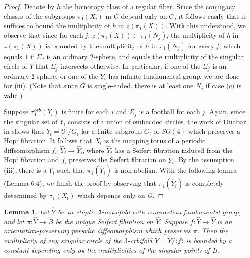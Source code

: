 \documentclass[11pt]{amsart}
\theoremstyle{plain}
\numberwithin{theorem}{section}
\newtheorem{lemma}[theorem]{Lemma}
\theoremstyle{definition}
\begin{document}
\begin{proof}
Denote by $h$ the homotopy class of a regular fiber. Since the conjugacy 
classes of the subgroups $\pi_1(X_i)$ in $G$ depend only on $G$, it follows easily that 
it suffices to bound the multiplicity of $h$ in $z(\pi_1(X))$. With this understood, we observe 
that since for each $j$, $z(\pi_1(X))\subset \pi_1(N_j)$, the multiplicity of $h$ in $z(\pi_1(X))$ 
is bounded by the multiplicity of $h$ in $\pi_1(N_j)$ for every $j$, which equals $1$ if 
$\Sigma_j$ is an ordinary $2$-sphere, and equals the multiplicity of the singular circle 
of $Y$ that $\Sigma_j$ intersects otherwise. In particular, if one of the $\Sigma_j$ is an ordinary 
$2$-sphere, or one of the $Y_i$ has infinite fundamental group, we are done for (iii).
(Note that since $G$ is single-ended, there is at least one $N_j$ if case (c) is valid.)

Suppose $\pi_1^{orb}(Y_i)$ is finite for each $i$ and $\Sigma_j$ is a football for each $j$. 
Again, since the singular set of $Y_i$ consists of a union of embedded circles, the work of 
Dunbar in \cite{Dun} shows that $Y_i={{\mathbb S}}^3/G_i$ for a finite subgroup $G_i$ of $SO(4)$ 
which preserves a Hopf fibration. It follows that $X_i$ is the mapping torus of a periodic 
diffeomorphism $f_i:\hat{Y}_i\rightarrow \hat{Y}_i$, where $\hat{Y}_i$ has a Seifert fibration
induced from the Hopf fibration and $f_i$ preserves the Seifert fibration on $\hat{Y}_i$.
By the assumption (iii), there is a $Y_i$ such that $\pi_1(\hat{Y}_i)$ is non-abelian.
With the following lemma (Lemma 6.4), we finish the proof by observing that $\pi_1(\hat{Y}_i)$ 
is completely determined by $\pi_1(X_i)$ which depends only on $G$.

\end{proof}

\begin{lemma}
Let $\hat{Y}$ be an elliptic $3$-manifold with non-abelian fundamental group, and let $\pi: \hat{Y}
\rightarrow B$ be the unique Seifert fibration on $\hat{Y}$. Suppose $f:\hat{Y}\rightarrow \hat{Y}$ 
is an orientation-preserving periodic diffeomorphism which preserves $\pi$. Then the multiplicity 
of any singular circle of the $3$-orbifold $Y=\hat{Y}/\langle f\rangle$ is bounded by a constant 
depending only on the multiplicities of the singular points of $B$.
\end{lemma}
\end{document}
